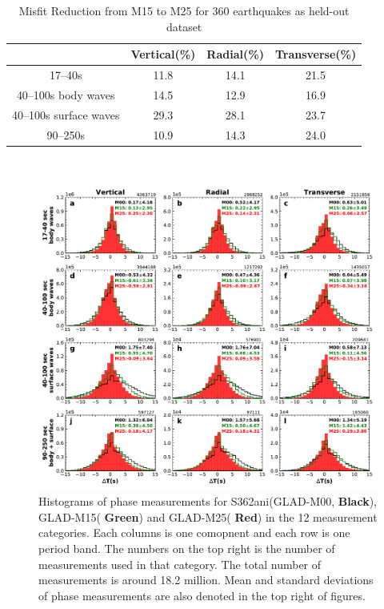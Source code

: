 \documentclass[extra,mreferee]{gji}
\begin{document}
\begin{table}[!htb]
  \centering
  \begin{tabular}{|c|c|c|c|}
  \hline
  ~          &  Vertical(\%) & Radial(\%) &  Transverse(\%) \\
  \hline
  17--40s                &          11.8 &       14.1 &       21.5 \\
  40--100s body waves    &          14.5 &       12.9 &       16.9 \\
  40--100s surface waves &          29.3 &       28.1 &       23.7 \\
  90--250s               &          10.9 &       14.3 &       24.0 \\
  \hline
  \end{tabular}\\
  \caption{Misfit Reduction from M15 to M25 for 360 earthquakes as held-out dataset}
  \label{table:misfit_reduction_M15_M25_360}
\end{table}


\begin{figure}
  \centering
  \includegraphics[width=\textwidth]{figures/dt_histogram.pdf}
  \caption{Histograms of phase measurements for S362ani(GLAD-M00, \textbf{Black}), GLAD-M15(\textbf{{\color{ForestGreen} Green}}) and GLAD-M25(\textbf{{\color{Red} Red}}) in the 12 measurement categories. Each columns is one comopnent and each row is one period band. The numbers on the top right is the number of measurements used in that category. The total number of measurements is around 18.2 million. Mean and standard deviations of phase measurements are also denoted in the top right of figures.}
  \label{fig:phase_hist}
\end{figure}
\end{document}
